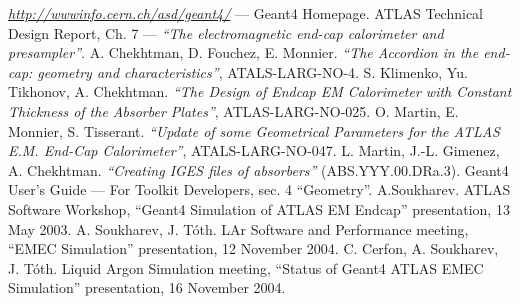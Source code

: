 \begin{thebibliography}{10}
 \underline{\em http://wwwinfo.cern.ch/asd/geant4/} --- Geant4
Homepage.
 ATLAS Technical Design Report, Ch. 7 --- {\em ``The
electromagnetic end-cap calorimeter and presampler''\/}.
 A. Chekhtman, D. Fouchez, E. Monnier. {\em ``The Accordion in the
end-cap: geometry and characteristics''\/}, ATALS-LARG-NO-4.
 S. Klimenko, Yu. Tikhonov, A. Chekhtman. {\em ``The Design of
Endcap EM Calorimeter with Constant Thickness of the Absorber Plates''\/},
ATLAS-LARG-NO-025.
 O. Martin, E. Monnier, S. Tisserant. {\em ``Update of some
Geometrical Parameters for the ATLAS E.M. End-Cap Calorimeter''\/},
ATALS-LARG-NO-047. 
 L. Martin, J.-L. Gimenez, A. Chekhtman. {\em ``Creating
IGES files of absorbers''} (ABS.YYY.00.DRa.3).
 Geant4 User's Guide --- For Toolkit Developers, sec. 4
``Geometry''.
  A.Soukharev. ATLAS Software Workshop, ``Geant4 Simulation
of ATLAS EM Endcap'' presentation,  13 May 2003.
 A. Soukharev, J. T\'oth. LAr Software and Performance meeting,
``EMEC Simulation'' presentation, 12 November 2004.
 C. Cerfon, A. Soukharev, J. T\'oth. Liquid Argon Simulation meeting, ``Status
of Geant4 ATLAS EMEC Simulation'' presentation, 16 November 2004.
\end{thebibliography}

